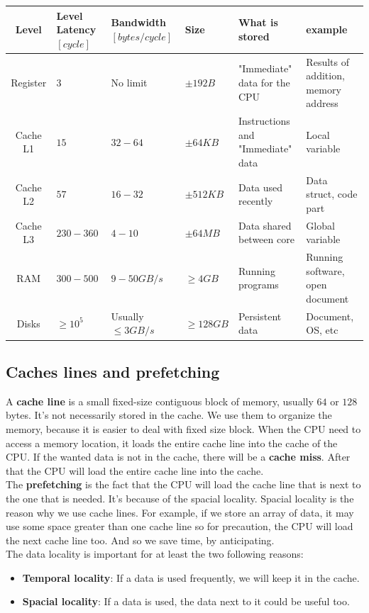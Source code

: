 \documentclass[12pt, openany]{report}
\theoremstyle{definition}
\begin{document}
\begin{tabularx}{\textwidth}{|c|X|X|X|X|X|}
	\hline
	Level & Level \newline Latency $[cycle]$  & Bandwidth $[bytes/cycle]$ & Size & What \newline is stored & example \\
	\hline
	Register & $3$ & No limit & $\pm 192B$ & "Immediate" data for the CPU & Results of addition, memory address\\
	\hline
	Cache L1 & $15$ & $32-64$ & $\pm 64KB$ & Instructions and \newline "Immediate" data & Local \newline variable\\
	\hline
	Cache L2 & $57$ & $16-32$ & $\pm 512KB$ & Data used recently & Data struct, code part\\
	\hline
	Cache L3 & $230-360$ & $4-10$ & $\pm 64MB$ & Data shared between core& Global \newline variable\\
	\hline
	RAM & $300-500$ & $9-50GB/s$ & $\geq 4GB$ & Running programs & Running software, open \newline document\\
	\hline
	Disks & $\geq 10^5$ & Usually $\leq 3GB/s$ & $\geq 128GB$ & Persistent data & Document, OS, etc\\
	\hline
\end{tabularx}
\subsection{Caches lines and prefetching}\label{caches_lines}
A \textbf{cache line} is a small fixed-size contiguous block of memory, usually $64$ or $128$ bytes. It's not necessarily stored in the cache. We use them to organize the memory, because it is easier to deal with fixed size block. When the CPU need to access a memory location, it loads the entire cache line into the cache of the CPU.
If the wanted data is not in the cache, there will be a \textbf{cache miss}. After that the CPU will load the entire cache line into the cache.\\
The \textbf{prefetching} is the fact that the CPU will load the cache line that is next to the one that is needed. It's because of the spacial locality. Spacial locality is the reason why we use cache lines. For example, if we store an array of data, it may use some space greater than one cache line so for precaution, the CPU will load the next cache line too. And so we save time, by anticipating.\\
The data locality is important for at least the two following reasons:
\begin{itemize}
	\item \textbf{Temporal locality}: If a data is used frequently, we will keep it in the cache.
	\item \textbf{Spacial locality}: If a data is used, the data next to it could be useful too.
\end{itemize}
\newpage
\end{document}
